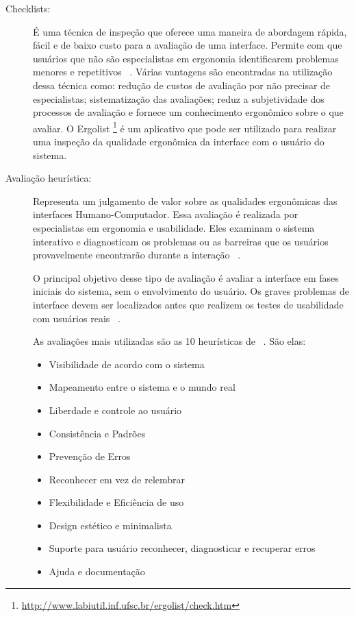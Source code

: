 \begin{description}

\item[Checklists:]

	É uma técnica de inspeção que oferece uma maneira de abordagem rápida, fácil e de baixo custo para a avaliação de uma interface. Permite com que usuários que não são especialistas em ergonomia identificarem problemas menores e repetitivos ~\cite{cybis2010}.
%
Várias vantagens são encontradas na utilização dessa técnica como: redução de custos de avaliação por não precisar de especialistas; sistematização das avaliações; reduz a subjetividade dos processos de avaliação e fornece um conhecimento ergonômico sobre o que avaliar.
%
O Ergolist \footnote{\url{http://www.labiutil.inf.ufsc.br/ergolist/check.htm}} é um aplicativo que pode ser utilizado para realizar uma inspeção da qualidade ergonômica da interface com o usuário do sistema.

\item[Avaliação heurística:]

	Representa um julgamento de valor sobre as qualidades ergonômicas das interfaces Humano-Computador. Essa avaliação é realizada por especialistas em ergonomia e usabilidade. Eles examinam o sistema interativo e diagnosticam os problemas ou as barreiras que os usuários provavelmente encontrarão durante a interação ~\cite{cybis2010}.

	O principal objetivo desse tipo de avaliação é avaliar a interface em fases iniciais do sistema, sem o envolvimento do usuário. Os graves problemas de interface devem ser localizados antes que realizem os testes de usabilidade com usuários reais ~\cite{santos2012}.

	As avaliações mais utilizadas são as 10 heurísticas de ~. São elas:

	\begin{itemize}
		\item{Visibilidade de acordo com o sistema}
		\item{Mapeamento entre o sistema e o mundo real}
		\item{Liberdade e controle ao usuário}
		\item{Consistência e Padrões}
		\item{Prevenção de Erros}
		\item{Reconhecer em vez de relembrar}
		\item{Flexibilidade e Eficiência de uso}
		\item{Design estético e minimalista}
		\item{Suporte para usuário reconhecer, diagnosticar e recuperar erros}
		\item{Ajuda e documentação}
	\end{itemize}



\end{description}
